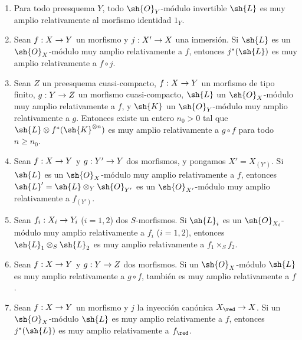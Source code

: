 \documentclass[oneside,10pt]{amsart}
\makeatletter
\renewcommand{\geq}{\geqslant}
\newcommand{\ega@arrow}[2]{\mathchoice{#1}{#2}{#2}{#2}}
\renewcommand{\to}{\ega@arrow{\longrightarrow}{\rightarrow}}
\let\EGAOriginalLabel\label
\renewcommand{\label}[1]{\phantomsection\EGAOriginalLabel{#1}}
\makeatother
\begin{document}
\begin{proposition}[4.4.10]
\label{II.4.4.10}
\medskip\noindent
\begin{enumerate}
  \item[\rm{(i)}] Para todo preesquema $Y$, todo $\sh{O}_Y$-módulo invertible $\sh{L}$ es muy amplio relativamente al morfismo identidad $1_Y$.
  \item[\rm{(i \emph{bis})}] Sean $f:X\to Y$ un morfismo y $j:X'\to X$ una inmersión.
    Si $\sh{L}$ es un $\sh{O}_X$-módulo muy amplio relativamente a $f$, entonces $j^*(\sh{L})$ es muy amplio relativamente a $f\circ j$.
  \item[\rm{(ii)}] Sean $Z$ un preesquema cuasi-compacto, $f:X\to Y$ un morfismo de tipo finito, $g:Y\to Z$ un morfismo cuasi-compacto, $\sh{L}$ un $\sh{O}_X$-módulo muy amplio relativamente a $f$, y $\sh{K}$ un $\sh{O}_Y$-módulo muy amplio relativamente a $g$.
    Entonces existe un entero $n_0>0$ tal que $\sh{L}\otimes f^*(\sh{K}^{\otimes n})$ es muy amplio relativamente a $g\circ f$ para todo $n\geq n_0$.
  \item[\rm{(iii)}] Sean $f:X\to Y$ y $g:Y'\to Y$ dos morfismos, y pongamos $X'=X_{(Y')}$.
    Si $\sh{L}$ es un $\sh{O}_X$-módulo muy amplio relativamente a $f$, entonces $\sh{L}'=\sh{L}\otimes_Y\sh{O}_{Y'}$ es un $\sh{O}_{X'}$-módulo muy amplio relativamente a $f_{(Y')}$.
  \item[\rm{(iv)}] Sean $f_i:X_i\to Y_i$ ($i=1,2$) dos $S$-morfismos.
    Si $\sh{L}_i$ es un $\sh{O}_{X_i}$-módulo muy amplio relativamente a $f_i$ ($i=1,2$), entonces $\sh{L}_1\otimes_S\sh{L}_2$ es muy amplio relativamente a $f_1\times_S f_2$.
  \item[\rm{(v)}] Sean $f:X\to Y$ y $g:Y\to Z$ dos morfismos.
    Si un $\sh{O}_X$-módulo $\sh{L}$ es muy amplio relativamente a $g\circ f$, también es muy amplio relativamente a $f$.
  \item[\rm{(vi)}] Sean $f:X\to Y$ un morfismo y $j$ la inyección canónica $X_\red\to X$.
    Si un $\sh{O}_X$-módulo $\sh{L}$ es muy amplio relativamente a $f$, entonces $j^*(\sh{L})$ es muy amplio relativamente a $f_\red$.
\end{enumerate}
\end{proposition}
\end{document}

